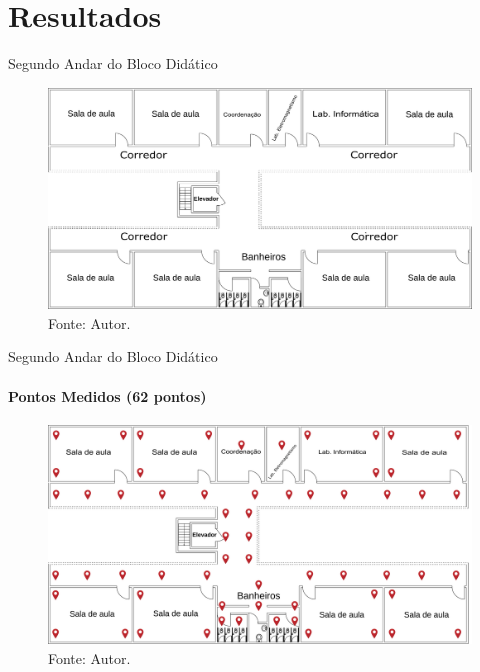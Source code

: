 \documentclass[aspectratio=169,12pt]{beamer}
\begin{document}
\section{Resultados}
\begin{frame}{Segundo Andar do Bloco Didático}
	\vspace*{-3mm}
	\begin{figure}[H]
		\centering
		\caption*{{\fontsize{9pt}{11}\selectfont Planta Baixa do 2º andar.}}
		\includegraphics[scale=0.135]{fig_tcc/planta_andar2.pdf}
		\caption*{{\fontsize{9pt}{11}\selectfont Fonte: Autor.}}
	\end{figure}
\end{frame}
\begin{frame}{Segundo Andar do Bloco Didático}
	\framesubtitle{Pontos Medidos (62 pontos)}
	\vspace*{-3mm}
	\begin{figure}[H]
		\centering
		\caption*{{\fontsize{9pt}{11}\selectfont Pontos medidos no 2º andar.}}
		\includegraphics[scale=0.12]{fig_tcc/Pontos_Medidos_Andar02.pdf}
		\caption*{{\fontsize{9pt}{11}\selectfont Fonte: Autor.}}
	\end{figure}
\end{frame}
\end{document}
